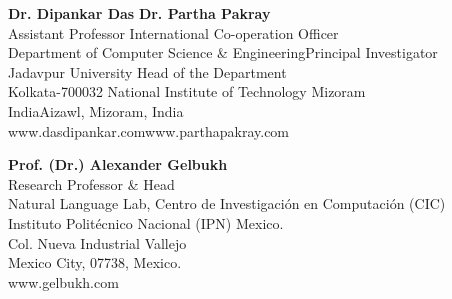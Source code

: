 \textbf{Dr. Dipankar Das}    \hfill        \textbf{Dr. Partha Pakray} \\
Assistant Professor
 \hfill International Co-operation Officer\\
Department of Computer Science \& Engineering\hfill Principal Investigator \\
Jadavpur University \hfill Head of the Department\\
Kolkata-700032 \hfill National Institute of Technology Mizoram \\
India\hfill Aizawl, Mizoram, India\\
www.dasdipankar.com\hfill www.parthapakray.com


\textbf{Prof. (Dr.) Alexander Gelbukh}\\
Research Professor \& Head\\
Natural Language Lab,
Centro de Investigación en Computación (CIC)\\ Instituto Politécnico Nacional (IPN) Mexico.\\
Col. Nueva Industrial Vallejo\\
Mexico City, 07738, Mexico.\\
www.gelbukh.com

